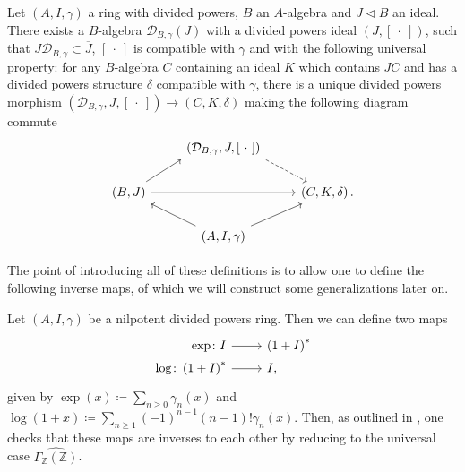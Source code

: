 \documentclass[../Main]{subfiles}
\begin{document}
\begin{thm}
	Let $\left(A, I, \gamma\right)$ a ring with divided powers, $B$ an $A$-algebra
	and $J \triangleleft B$ an ideal.
	There exists a $B$-algebra $\mathcal{D}_{B,\gamma}(J)$
	with a divided powers ideal $\left(J, [\ \cdot \ ]\right)$,
	such that $J \mathcal{D}_{B, \gamma} \subset \overline{J}$,
	$[\ \cdot \ ]$ is compatible with $\gamma$ and with the
	following universal property:
	for any $B$-algebra $C$ containing an ideal
	$K$ which contains $JC$ and has a divided powers structure
	$\delta$ compatible  with $\gamma$, there is a unique 
	divided powers morphism 
	$\left(\mathcal{D}_{B,\gamma}, J, [\ \cdot \ ]\right) \to 
	\left(C, K, \delta\right)$ making the following
	diagram commute
	\begin{equation*}
	\begin{tikzcd}
		&
		\left(\mathcal{D}_{B, \gamma}, J, [\ \cdot \ ]\right)
		\arrow[rd, "", dashrightarrow,
		start anchor=south east] & \\
		\left(B, J\right) \arrow[ru, "", rightarrow,
		end anchor=south west] 
		\arrow[rr, "", rightarrow] & &
		\left(C, K, \delta\right). \\
		&
		\left(A, I, \gamma\right)
		\arrow[lu, "", rightarrow,
		start anchor=north west] 
		\arrow[ru, "", rightarrow,
		start anchor=north east] & 
	\end{tikzcd}
	\end{equation*}
\end{thm}


\noindent
The point of introducing all of these definitions is to allow one to define the following
inverse maps, of which we will construct some generalizations later on.
\begin{defn}[]
	Let $\left(A, I, \gamma\right)$ be a nilpotent divided powers ring.
	Then we can define two maps
	\begin{equation*}
	\begin{tikzcd}[row sep = 0ex
		,/tikz/column 1/.append style={anchor=base east}
		,/tikz/column 2/.append style={anchor=base west}]
		\exp\colon I \arrow[r, "", rightarrow] &
		\left( 1 + I \right)^*\\
		\log\colon \left( 1 + I \right)^* \arrow[r, "", rightarrow] &
		I
	,\end{tikzcd}
	\end{equation*} 
	given by 
	$\exp (x) \coloneqq \sum_{n\geq 0} \gamma_n(x)$
	and $\log (1+x) \coloneqq \sum_{n\geq 1} 
	(-1)^{n-1} \left( n-1 \right)! \gamma_n(x)$.
	Then, as outlined in \cite[Chapter III, \S1.6]{Messing},
	one checks that these maps are inverses to each other
	by reducing to the universal case $\widehat{\Gamma_{\mathbb{Z}}(\mathbb{Z})}$.
\end{defn}
\end{document}

